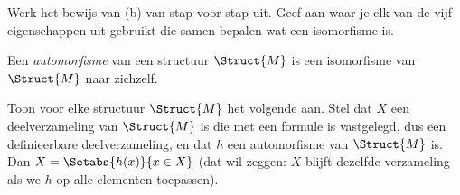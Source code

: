 \documentclass[../../../include/open-logic-section]{subfiles}
\begin{document}
\begin{prob}
Werk het bewijs van (b) van  stap voor
stap uit. Geef aan waar je elk van de vijf eigenschappen uit
 gebruikt die samen bepalen wat
een isomorfisme is.
\end{prob}

\begin{defn}
Een \emph{automorfisme} van een structuur $\Struct{M}$ is een
isomorfisme van $\Struct{M}$ naar zichzelf.
\end{defn}

\begin{prob}
Toon voor elke structuur $\Struct{M}$ het volgende aan. Stel dat $X$ een
deelverzameling van $\Struct{M}$ is die met een formule is vastgelegd,
dus een definieerbare deelverzameling, en dat $h$ een automorfisme van
$\Struct{M}$ is. Dan $X = \Setabs{h(x)}{x \in X}$ (dat wil zeggen: $X$
blijft dezelfde verzameling als we $h$ op alle elementen toepassen).
\end{prob}
\end{document}
